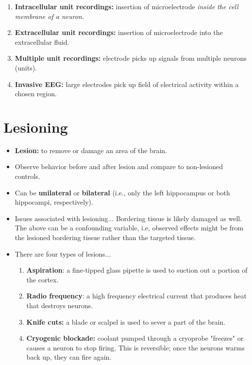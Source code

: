 \documentclass[12pt,a4paper]{article}
\begin{document}
	\begin{enumerate}
		\item \textbf{Intracellular unit recordings:} insertion of microelectrode \textit{inside the cell membrane of a neuron}. 
		\item \textbf{Extracellular unit recordings:} insertion of microelectrode into the extracellular fluid. 
		\item \textbf{Multiple unit recordings:} electrode picks up signals from multiple neurons (units).
		\item \textbf{Invasive EEG:} large electrodes pick up field of electrical activity within a chosen region. 
	\end{enumerate}
	
	\section{Lesioning}
	
	\begin{itemize}
		\item \textbf{Lesion:} to remove or damage an area of the brain. 
		\item Observe behavior before and after lesion and compare to non-lesioned controls. 
		\item Can be \textbf{unilateral} or \textbf{bilateral} (i.e., only the left hippocampus or both hippocampi, respectively).
		\item Issues associated with lesioning...
		\subitem Bordering tissue is likely damaged as well. 
		\subitem The above can be a confounding variable, i.e, observed effects might be from the lesioned bordering tissue rather than the targeted tissue. 
		\item There are four types of lesions...
		\begin{enumerate}
			\item \textbf{Aspiration}: a fine-tipped glass pipette is used to suction out a portion of the cortex. 
			\item \textbf{Radio frequency}: a high frequency electrical current that produces heat that destroys neurons. 
			\item \textbf{Knife cuts:} a blade or scalpel is used to sever a part of the brain. 
			\item \textbf{Cryogenic blockade:} coolant pumped through a cryoprobe "freezes" or causes a neuron to stop firing. 
			\subitem This is reversible; once the neurons warms back up, they can fire again. 
		\end{enumerate}
	\end{itemize}
	
\end{document}
